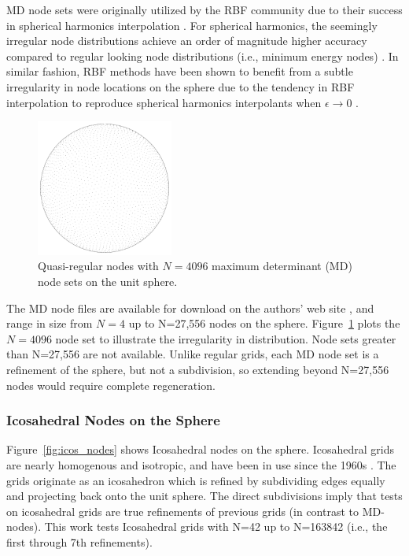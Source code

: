 \documentclass[11pt]{report}
\begin{document}
{MD node sets were originally utilized by the RBF community due to their success in spherical harmonics interpolation \cite{Fornberg2007}. For spherical harmonics, the seemingly irregular node distributions achieve an order of magnitude higher accuracy compared to regular looking node distributions (i.e., minimum energy nodes) \cite{Womersley2001}. In similar fashion, RBF methods have been shown to benefit from a subtle irregularity in node locations on the sphere due to the tendency in RBF interpolation to reproduce spherical harmonics interpolants when $\epsilon \rightarrow 0$ \cite{Fornberg2007}. 

\begin{figure} 
\centering
\includegraphics[width=0.4\textwidth]{rbffd_methods_content/grids/N4096_points.pdf} 
\caption{Quasi-regular nodes with $N=4096$ maximum determinant (MD) node sets on the unit sphere.} 
\label{fig:md_nodes}
\end{figure}

The MD node files are available for download on the authors' web site \cite{WomersleySloanMDNodes}, and range in size from $N=4$ up to N=27,556 nodes on the sphere. Figure~\ref{fig:md_nodes} plots the $N=4096$ node set to illustrate the irregularity in distribution. Node sets greater than N=27,556 are not available. Unlike regular grids, each MD node set is a refinement of the sphere, but not a subdivision, so extending beyond N=27,556 nodes would require complete regeneration.


\subsubsection{Icosahedral Nodes on the Sphere}

Figure~\ref{fig:icos_nodes} shows Icosahedral nodes on the sphere. Icosahedral grids are nearly homogenous and isotropic, and have been in use since the 1960s \cite{Randall2002}. The grids originate as an icosahedron which is refined by subdividing edges equally and projecting back onto the unit sphere. The direct subdivisions imply that tests on icosahedral grids are true refinements of previous grids (in contrast to MD-nodes). This work tests Icosahedral grids with N=42 up to N=163842 (i.e., the first through 7th refinements). 

}
\end{document}
